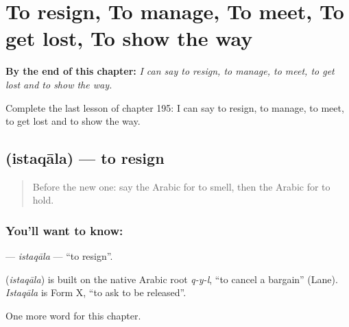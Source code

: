 
\chapter{To resign, To manage, To meet, To get lost, To show the way}
\label{ch:ar-to-resign-to-manage-to-meet-to-get-lost-to-show-the-way}

\begin{chapteropening}
\textbf{By the end of this chapter:} \emph{I can say to resign, to manage, to meet, to get lost and to show the way.}

Complete the last lesson of chapter 195: I can say to resign, to manage, to meet, to get lost and to show the way.
\end{chapteropening}

\section[\texorpdfstring{\ar{استقال} (istaqāla)}{استقال (istaqāla)}]{ (istaqāla) — to resign}

\label{lesson:AR-C195-istaqala}



\begin{quote}
Before the new one: say the Arabic for to smell, then the Arabic for to hold.
\end{quote}

\subsection*{You'll want to know: }
\textbf{} — \emph{istaqāla} — \textquotedblleft{}to resign\textquotedblright{}.

\begin{cousinweb}
\textbf{} (\emph{istaqāla}) is built on the native Arabic root \emph{q-y-l}, \textquotedblleft{}to cancel a bargain\textquotedblright{} (Lane). \emph{Istaqāla} is Form X, \textquotedblleft{}to ask to be released\textquotedblright{}.
\end{cousinweb}

\begin{grammarlens}[title={What you've built}]
One more word for this chapter.
\end{grammarlens}

